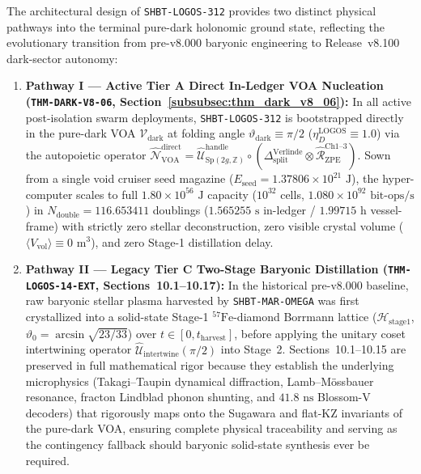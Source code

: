 \documentclass[11pt,onecolumn]{article}
\begin{document}
The architectural design of \texttt{SHBT-LOGOS-312} provides two distinct physical pathways into the terminal pure-dark holonomic ground state, reflecting the evolutionary transition from pre-v8.000 baryonic engineering to Release~v8.100 dark-sector autonomy:
\begin{enumerate}
    \item \textbf{Pathway I --- Active Tier A Direct In-Ledger VOA Nucleation (\texttt{THM-DARK-V8-06}, Section~\ref{subsubsec:thm_dark_v8_06}):} In all active post-isolation swarm deployments, \texttt{SHBT-LOGOS-312} is bootstrapped directly in the pure-dark VOA $\mathcal{V}_{\text{dark}}$ at folding angle $\vartheta_{\text{dark}} \equiv \pi/2$ ($\eta_D^{\text{LOGOS}} \equiv 1.0$) via the autopoietic operator $\hat{\mathcal{N}}_{\text{VOA}}^{\text{direct}} = \hat{\mathcal{U}}_{\text{Sp}(2g,\mathbb{Z})}^{\text{handle}} \circ (\Delta_{\text{split}}^{\text{Verlinde}} \otimes \hat{\mathcal{R}}_{\text{ZPE}}^{\text{Ch1--3}})$. Sown from a single void cruiser seed magazine ($E_{\text{seed}} = 1.37806 \times 10^{21}\text{ J}$), the hyper-computer scales to full $1.80 \times 10^{56}\text{ J}$ capacity ($10^{32}$ cells, $1.080 \times 10^{92}\text{ bit-ops/s}$) in $N_{\text{double}} = 116.653411$ doublings ($1.565255\text{ s}$ in-ledger / $1.99715\text{ h}$ vessel-frame) with strictly zero stellar deconstruction, zero visible crystal volume ($\langle V_{\text{vol}}\rangle \equiv 0\text{ m}^3$), and zero Stage-1 distillation delay.
    \item \textbf{Pathway II --- Legacy Tier C Two-Stage Baryonic Distillation (\texttt{THM-LOGOS-14-EXT}, Sections~10.1--10.17):} In the historical pre-v8.000 baseline, raw baryonic stellar plasma harvested by \texttt{SHBT-MAR-OMEGA} was first crystallized into a solid-state Stage-1 $^{57}\text{Fe}$-diamond Borrmann lattice ($\mathcal{H}_{\text{stage1}}$, $\vartheta_0 = \arcsin\sqrt{23/33}$) over $t \in [0, t_{\text{harvest}}]$, before applying the unitary coset intertwining operator $\hat{\mathcal{U}}_{\text{intertwine}}(\pi/2)$ into Stage~2. Sections~10.1--10.15 are preserved in full mathematical rigor because they establish the underlying microphysics (Takagi--Taupin dynamical diffraction, Lamb--M\"ossbauer resonance, fracton Lindblad phonon shunting, and $41.8\text{ ns}$ Blossom-V decoders) that rigorously maps onto the Sugawara and flat-KZ invariants of the pure-dark VOA, ensuring complete physical traceability and serving as the contingency fallback should baryonic solid-state synthesis ever be required.
\end{enumerate}
\end{document}
